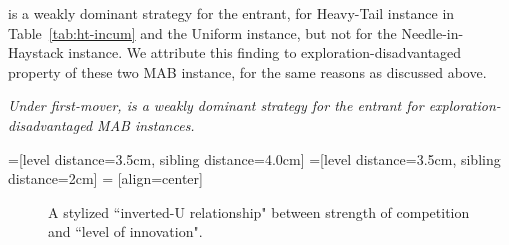 \documentclass[../competing_bandits_with_appendix.tex]{subfiles}
\begin{document}
\DynamicGreedy is a weakly dominant strategy for the entrant, for Heavy-Tail instance in Table~\ref{tab:ht-incum} and the Uniform instance, but not for the Needle-in-Haystack instance. We attribute this finding to exploration-disadvantaged property of these two MAB instance, for the same reasons as discussed above.

\begin{finding}\label{find:temp-monopoly-entrant}
\textit{Under first-mover, \DynamicGreedy is a weakly dominant strategy for the entrant for exploration-disadvantaged MAB instances.
}
\end{finding}


=[level distance=3.5cm, sibling distance=4.0cm]
=[level distance=3.5cm, sibling distance=2cm]
 = [align=center]

\begin{figure}[t]
\begin{center}
 \caption{\footnotesize A stylized ``inverted-U relationship" between strength of competition and ``level of innovation".}
\label{fig:inverted-U-expts}
\end{center}
\end{figure}
\end{document}
